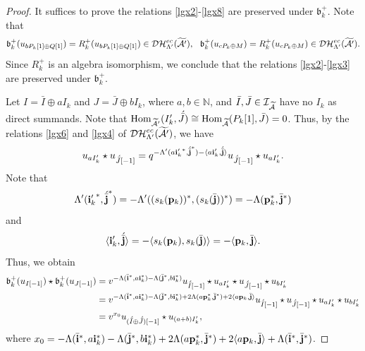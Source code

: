 \documentclass[reqno,12pt]{amsart}
\numberwithin{equation}{section}
\def\lr#1{\langle #1\rangle} \def\fin{\hfill$\square$}  \def\lra{\longrightarrow} \def\mod{\mbox{\rm \textbf{mod}}\,}\def\Mod{\mbox{\rm mod}\,}\def\top{\mbox{\rm top}\,}\def\soc{\mbox{\rm soc}\,}
\theoremstyle{plain} %
\theoremstyle{definition} %
\begin{document}
\begin{proof}
It suffices to prove the relations \eqref{lgx2}-\eqref{lgx8} are preserved under $\mathfrak{b}_k^+$.
Note that $$\mathfrak{b}_k^+(u_{bP_k[1]\oplus Q[1]})=R_k^+(u_{bP_k[1]\oplus Q[1]})\in \mathcal{DH}_{\Lambda'}^{ec}(\widetilde{\mathcal{A}'}),~~\mathfrak{b}_k^+(u_{cP_k\oplus M})=R_k^+(u_{cP_k\oplus M})\in \mathcal{DH}_{\Lambda'}^{ec}(\widetilde{\mathcal{A}'}).$$
Since $R_k^+$ is an algebra isomorphism,
we conclude that the relations \eqref{lgx2}-\eqref{lgx3} are preserved under $\mathfrak{b}_k^+$.
	
 Let $I=\bar{I}\oplus aI_k$ and $J=\bar{J}\oplus bI_k$, where $a,b\in \mathbb{N}$, and $\bar{I}, \bar{J}\in\mathcal{I}_{\widetilde{\mathcal{A}}}$ have no $I_k$ as direct summands. Note that $\mbox{\rm Hom}_{\widetilde{\mathcal{A}'}}(I'_k,\acute{\bar{J}})\cong\mbox{\rm Hom}_{\widetilde{\mathcal{A}}}(P_k[1],\bar{J})=0$.
Thus, by the relations \eqref{lgx6} and \eqref{lgx4} of $\mathcal{DH}_{\Lambda'}^{ec}(\widetilde{\mathcal{A}'})$, we have
\[ u_{aI_k'}\star u_{\acute{\bar{J}}[-1]}=q^{-\Lambda'(a{{\bf i}'_k}^\ast,{\acute{\bar{\bf j}}}^\ast)-\lr{ a{\bf i}_k',\acute{\bar{\bf j}}}}u_{\acute{\bar{J}}[-1]}\star u_{aI_k'}.\]
Note that \begin{equation*}\Lambda'({{\bf i}'_k}^\ast, {\acute{\bar{\bf j}}}^\ast)=-\Lambda'((s_k({\bf p}_k))^\ast,(s_k(\bar{\bf j}))^\ast)=-\Lambda({\bf p}_k^\ast,{\bar{\bf j}}^\ast)\end{equation*} and
\begin{equation*}\lr{{\bf i}_k',{\acute{\bar{\bf j}}}}=-\lr{s_k({\bf p}_k),s_k(\bar{\bf j})}=-\lr{{\bf p}_k,\bar{\bf j}}.\end{equation*}
Thus, we obtain
	 \begin{align*}
	 	\mathfrak{b}_k^+(u_{I[-1]})\star\mathfrak{b}_k^+(u_{J[-1]})&=v^{-\Lambda(\bar{\bf i}^\ast, a{\bf i}_k^\ast)-\Lambda(\bar{\bf j}^\ast, b{\bf i}_k^\ast)}u_{\acute{\bar{I}}[-1]}\star u_{aI_k'}\star u_{\acute{\bar{J}}[-1]}\star u_{bI_k'}\\
	 	&=v^{-\Lambda(\bar{\bf i}^\ast, a{\bf i}_k^\ast)-\Lambda(\bar{\bf j}^\ast, b{\bf i}_k^\ast)+2\Lambda(a{\bf p}_k^\ast,{\bar{\bf j}}^\ast)+2\lr{a{\bf p}_k,\bar{\bf j}}}u_{\acute{\bar{I}}[-1]}\star  u_{\acute{\bar{J}}[-1]}\star u_{aI_k'}\star u_{bI_k'}\\
	 	&=v^{x_0}u_{(\acute{\bar{I}}\oplus \acute{\bar{J}})[-1]}\star u_{(a+b)I_k'},
	 \end{align*}
where $x_0=-\Lambda(\bar{\bf i}^\ast, a{\bf i}_k^\ast)-\Lambda(\bar{\bf j}^\ast, b{\bf i}_k^\ast)+2\Lambda(a{\bf p}_k^\ast,{\bar{\bf j}}^\ast)+2\lr{a{\bf p}_k,\bar{\bf j}}+\Lambda(\bar{\bf i}^\ast,\bar{\bf j}^\ast)$.


\end{proof}
\end{document}
